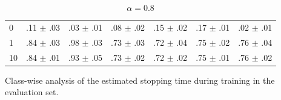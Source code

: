 \documentclass[%
  aspectratio=169,
  9pt,
  USenglish,
  titlegraphic, %
  progressbar,
]{beamer}
\begin{document}
\begin{frame}
\begin{table}
\begin{subtable}{.5\textwidth}
\begin{tabular}{lcccccc}
				\cmidrule(lr){0-0}\cmidrule(lr){1-1}\cmidrule(lr){2-2}\cmidrule(lr){3-3}\cmidrule(lr){4-4}\cmidrule(lr){5-5}\cmidrule(lr){6-6}\cmidrule(lr){7-7}
				0 & .11 $\pm$ .03 & .03 $\pm$ .01 & .08 $\pm$ .02 & .15 $\pm$ .02 & .17 $\pm$ .01 & .02 $\pm$ .01 \\
				1 & .84 $\pm$ .03 & .98 $\pm$ .03 & .73 $\pm$ .03 & .72 $\pm$ .04 & .75 $\pm$ .02 & .76 $\pm$ .04 \\
				10 & .84 $\pm$ .01 & .93 $\pm$ .05 & .73 $\pm$ .02 & .72 $\pm$ .02 & .75 $\pm$ .01 & .76 $\pm$ .02 \\
				\bottomrule
			\end{tabular}
			\caption{\emph{$\alpha=0.8$}}
			\label{tab:epsilon:a08}
		\end{subtable}
		
	\end{table}
	
\end{frame}

\begin{frame}
	
	
		
		{Class-wise analysis of the estimated stopping time during training in the evaluation set.}
	
\end{frame}
\end{document}
